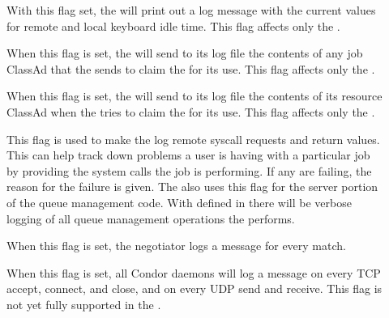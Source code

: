 \begin{description}
\begin{description}
\item[] \label{dflag:keyboard} 
  With this flag set, the  will print out a log message
  with the current values for remote and local keyboard idle time.
  This flag affects only the .

\item[] \label{dflag:job} When this flag is set, the
   will send to its log file the contents of any
  job ClassAd that the  sends to claim the
   for its use.  This flag affects only the
  .
  
\item[] \label{dflag:machine} When this flag is set,
  the  will send to its log file the contents of
  its resource ClassAd when the  tries to claim the
   for its use.  This flag affects only the
  .

\item[] \label{dflag:syscalls} This flag is used to
  make the  log remote syscall requests and return
  values.  This can help track down problems a user is having with a
  particular job by providing the system calls the job is
  performing. If any are failing, the reason for the
  failure is given.  The  also uses this flag for the server
  portion of the queue management code.  With 
  defined in  there will be verbose logging of all
  queue management operations the  performs.  

\item[] \label{dflag:match} When this flag is
  set, the negotiator logs a message for every match.

\item[] \label{dflag:network} When this flag is set,
  all Condor daemons will log a message on every TCP accept, connect,
  and close, and on every UDP send and receive.  This flag is not
  yet fully supported in the .

\end{description}

\end{description}

